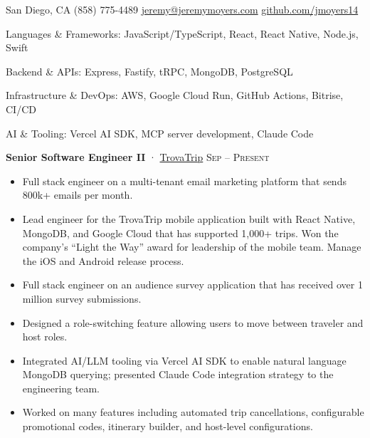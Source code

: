 \documentclass[10pt,a4paper]{article}
\begin{document}
\sloppy  %



\nobreakvspace{0.3em}  %

\noindent San Diego, CA\sbull
(858) 775-4489\sbull
\href{mailto:jeremy@jeremymoyers.com}{jeremy\mbox{}@\mbox{}jeremymoyers.com}\sbull
\href{https://github.com/jmoyers14}{github.com/jmoyers14}

\spacedhrule{0.9em}{-0.4em}


\inlineheadsection
  {Languages \& Frameworks:}
  {JavaScript/TypeScript, React, React Native, Node.js, Swift}

\inlineheadsection
  {Backend \& APIs:}
  {Express, Fastify, tRPC, MongoDB, PostgreSQL}

\inlineheadsection
  {Infrastructure \& DevOps:}
  {AWS, Google Cloud Run, GitHub Actions, Bitrise, CI/CD}

\inlineheadsection
  {AI \& Tooling:}
  {Vercel AI SDK, MCP server development, Claude Code}

\spacedhrule{1.0em}{-0.4em}


\headedsection
  {\textbf{Senior Software Engineer II} · \href{https://www.trovatrip.com}{TrovaTrip}}
  {\textsc{Sep  -- Present}} {%
  \begin{itemize}
    \setlength{\itemsep}{0.4em}
    \item Full stack engineer on a multi-tenant email marketing platform that sends 800k+ emails per month.
    \item Lead engineer for the TrovaTrip mobile application built with React Native, MongoDB, and Google Cloud that has supported 1,000+ trips. Won the company's ``Light the Way'' award for leadership of the mobile team. Manage the iOS and Android release process.
    \item Full stack engineer on an audience survey application that has received over 1 million survey submissions.
    \item Designed a role-switching feature allowing users to move between traveler and host roles.
    \item Integrated AI/LLM tooling via Vercel AI SDK to enable natural language MongoDB querying; presented Claude Code integration strategy to the engineering team.
    \item Worked on many features including automated trip cancellations, configurable promotional codes, itinerary builder, and host-level configurations.
  \end{itemize}
}
\end{document}
